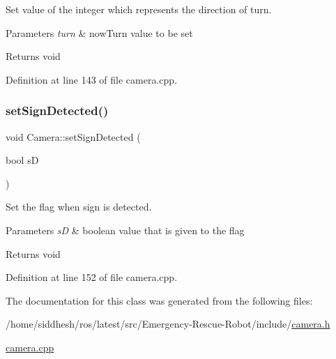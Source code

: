 Set value of the integer which represents the direction of turn. 


\begin{DoxyParams}{Parameters}
{\em turn} & now\+Turn value to be set \\
\hline
\end{DoxyParams}
\begin{DoxyReturn}{Returns}
void 
\end{DoxyReturn}


Definition at line 143 of file camera.\+cpp.

\mbox{\label{class_camera_ab51102514272832890346b414759e716}} 
\subsubsection{\texorpdfstring{set\+Sign\+Detected()}{setSignDetected()}}
{\footnotesize\ttfamily void Camera\+::set\+Sign\+Detected (\begin{DoxyParamCaption}\item[{bool}]{sD }\end{DoxyParamCaption})}



Set the flag when sign is detected. 


\begin{DoxyParams}{Parameters}
{\em sD} & boolean value that is given to the flag \\
\hline
\end{DoxyParams}
\begin{DoxyReturn}{Returns}
void 
\end{DoxyReturn}


Definition at line 152 of file camera.\+cpp.



The documentation for this class was generated from the following files\+:\begin{DoxyCompactItemize}
\item 
/home/siddhesh/ros/latest/src/\+Emergency-\/\+Rescue-\/\+Robot/include/\mbox{\hyperlink{camera_8h}{camera.\+h}}\item 
\mbox{\hyperlink{camera_8cpp}{camera.\+cpp}}\end{DoxyCompactItemize}
